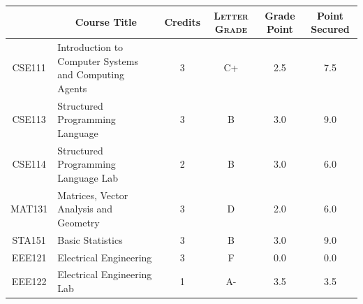 \documentclass[11pt]{article}
\newcommand*{\numtwo}[1]{\pgfmathprintnumber[
                    fixed, precision=2, fixed zerofill=true]{#1}}
\begin{document}
                \begin{center}
                    \renewcommand{\arraystretch}{1.08}
                    
                \begin{tabular}{|c|l|c|>{\scshape}c|c|c|}
                \hline  \rule[-1ex]{0pt}{3.5ex} {\centering{\bf Course Code}} &  \multicolumn{1}{c|}{\textbf{Course Title}}  & {\bf Credits} & {\bf Letter Grade} & {\bf Grade Point} & {\bf Point Secured}  \\ 
                \hline   CSE111 &  Introduction to Computer Systems and Computing Agents		 & 3 & C+ & 2.5 & 7.5 \\ %
                \hline   CSE113 &  Structured Programming Language		 & 3 & B & 3.0 & 9.0 \\ %
                \hline   CSE114 &  Structured Programming Language Lab		 & 2 & B & 3.0 & 6.0 \\ %
                \hline   MAT131 &  Matrices, Vector Analysis and Geometry		 & 3 & D & 2.0 & 6.0 \\ %
                \hline   STA151 &  Basic Statistics		 & 3 & B & 3.0 & 9.0 \\ %
                \hline   EEE121 &  Electrical Engineering		 & 3 & F & 0.0 & 0.0 \\ %
                \hline   EEE122 &  Electrical Engineering Lab		 & 1 & A- & 3.5 & 3.5 \\ %

\hline                %
                \end{tabular}
                \end{center}
                \renewcommand{\arraystretch}{1.03}
\end{document}
